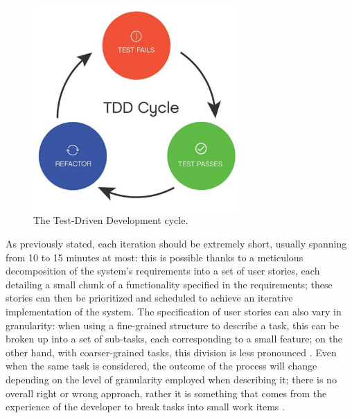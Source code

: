 \begin{figure}[h]
    \centering
    \includegraphics[width=8cm, scale=0.2]{figures/tdd_cycle.jpg}
    \caption{The Test-Driven Development cycle.}
    \label{tdd-cycle}
\end{figure}

As previously stated, each \tdd iteration should be extremely short, usually spanning from 10 to 15 minutes at most: this is possible thanks to a meticulous decomposition of the system's requirements into a set of user stories, each detailing a small chunk of a functionality specified in the requirements; these stories can then be prioritized and scheduled to achieve an iterative implementation of the system. The specification of user stories can also vary in granularity: when using a fine-grained structure to describe a task, this can be broken up into a set of sub-tasks, each corresponding to a small feature; on the other hand, with coarser-grained tasks, this division is less pronounced \cite{DBLP:journals/tse/KaracTJ21}. Even when the same task is considered, the outcome of the \tdd process will change depending on the level of granularity employed when describing it; there is no overall right or wrong approach, rather it is something that comes from the experience of the developer to break tasks into small work items \cite{DBLP:journals/tse/KaracTJ21}.


